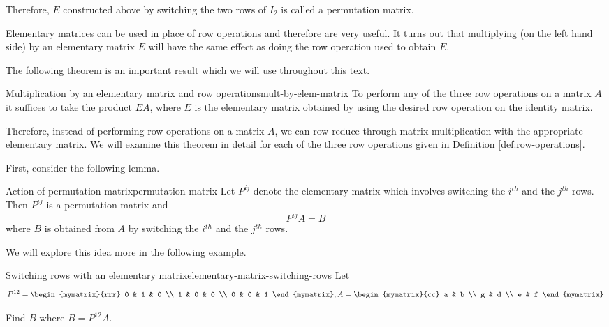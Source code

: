 Therefore, $E$ constructed above by switching the two rows of $I_2$ is called a permutation matrix. 

Elementary matrices can be used in place of row operations and therefore are very useful. It turns
out that multiplying (on the left hand side) by an elementary matrix $E$ will have the
same effect as doing the row operation used to obtain $E$.

The following theorem is an important result which we will use throughout this text. 

\begin{theorem}{Multiplication by an elementary matrix and row operations}{mult-by-elem-matrix}
To perform any of the three row operations on a matrix $A$
it suffices to take the product $EA$, where $E$ is the elementary matrix obtained by 
using the desired row operation on the identity matrix.
\end{theorem}

Therefore, instead of performing row operations on a matrix $A$, we
can row reduce through matrix multiplication with the appropriate
elementary matrix. We will examine this theorem in detail for each of
the three row operations given in Definition \ref{def:row-operations}.

First, consider the following lemma.

\begin{lemma}{Action of permutation matrix}{permutation-matrix}
Let $P^{ij}$ denote the elementary matrix which involves
switching the $i^{th}$ and the $j^{th}$ rows. Then $P^{ij}$ is a permutation matrix and 
\begin{equation*}
P^{ij}A=B
\end{equation*}
where $B$ is obtained from $A$ by switching the $i^{th}$ and the $j^{th}$
rows.
\end{lemma}

We will explore this idea more in the following example.

\begin{example}{Switching rows with an elementary matrix}{elementary-matrix-switching-rows}
Let
\begin{equation*}
P^{12} = \begin{mymatrix}{rrr}
0 & 1 & 0 \\
1 & 0 & 0 \\
0 & 0 & 1
\end{mymatrix}, A = \begin{mymatrix}{cc}
a & b \\
g & d \\
e & f
\end{mymatrix} 
\end{equation*}

Find $B$ where $B = P^{12}A$.
\end{example}


